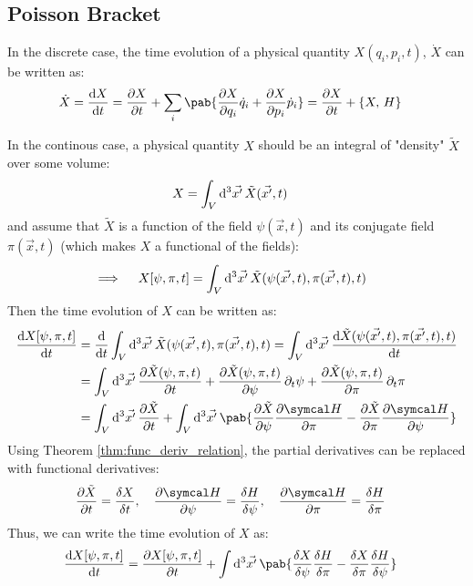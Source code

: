 \subsection{Poisson Bracket}
In the discrete case, the time evolution of a physical quantity $X(q_i, p_i, t)$, $\dot{X}$ can be written as:
\begin{align}
  \dot{X} =  \odv{X}{t} & =\pdv{X}{t} + \sum_i \pab{\pdv{X}{q_i} \dot{q}_i + \pdv{X}{p_i} \dot{p}_i} = \pdv{X}{t} + \pobra{X}{H}
\end{align}

In the continous case, a physical quantity $X$ should be an integral of "density" $\tilde{X}$ over some volume:
\begin{align}
  X & = \int_V \odif[3]{\vec{x'}} \, \tilde{X}(\vec{x'}, t)
\end{align}
and assume that $\tilde{X}$ is a function of the field $\psi(\vec{x}, t)$ and its conjugate field $\pi(\vec{x}, t)$ (which makes $X$ a functional of the fields):
\begin{align}
  \implies \quad X[\psi, \pi, t] & = \int_V \odif[3]{\vec{x'}} \, \tilde{X}(\psi(\vec{x'}, t), \pi(\vec{x'}, t), t)
\end{align}
Then the time evolution of $X$ can be written as:
\begin{align}
  \odv{X[\psi, \pi, t]}{t}
   & = \odv{}{t} \int_V \odif[3]{\vec{x'}} \, \tilde{X}(\psi(\vec{x'}, t), \pi(\vec{x'}, t), t) = \int_V \odif[3]{\vec{x'}} \, \odv{\tilde{X}(\psi(\vec{x'}, t), \pi(\vec{x'}, t), t)}{t} \\
   & = \int_V \odif[3]{\vec{x'}} \, \pdv{\tilde{X}(\psi, \pi, t)}{t}
  + \pdv{\tilde{X}(\psi, \pi, t)}{\psi} \pdif{t} \psi
  + \pdv{\tilde{X}(\psi, \pi, t)}{\pi} \pdif{t} \pi                                                                                                                                       \\
   & = \int_V \odif[3]{\vec{x'}} \, \pdv{\tilde{X}}{t}
  + \int_V \odif[3]{\vec{x'}} \, \pab{\pdv{\tilde{X}}{\psi} \pdv{\hami}{\pi} - \pdv{\tilde{X}}{\pi} \pdv{\hami}{\psi}}
\end{align}
Using Theorem \ref{thm:func_deriv_relation}, the partial derivatives can be replaced with functional derivatives:
\begin{align}
  \pdv{\tilde{X}}{t} & = \fdv{X}{t}, \quad \pdv{\hami}{\psi} = \fdv{H}{\psi}, \quad \pdv{\hami}{\pi} = \fdv{H}{\pi}
\end{align}
Thus, we can write the time evolution of $X$ as:
\begin{align}
  \odv{X[\psi, \pi, t]}{t}
   & = \pdv{X[\psi, \pi, t]}{t} + \int \odif[3]{\vec{x'}} \, \pab{\fdv{X}{\psi} \fdv{H}{\pi} - \fdv{X}{\pi} \fdv{H}{\psi}}
\end{align}
